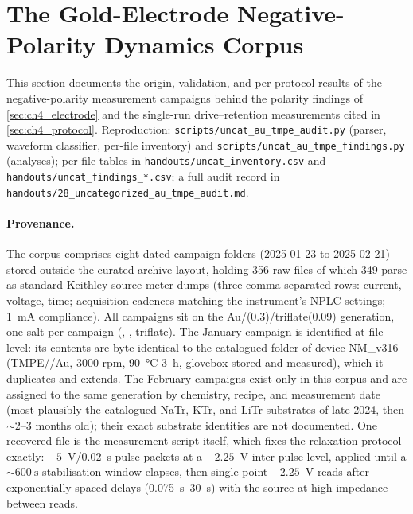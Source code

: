 \section{The Gold-Electrode Negative-Polarity Dynamics Corpus}\label{app:ch4_gold_dynamics}

This section documents the origin, validation, and per-protocol results of the
negative-polarity measurement campaigns behind the polarity findings of
\cref{sec:ch4_electrode} and the single-run drive--retention measurements cited in
\cref{sec:ch4_protocol}. Reproduction: \texttt{scripts/uncat\_au\_tmpe\_audit.py}
(parser, waveform classifier, per-file inventory) and
\texttt{scripts/uncat\_au\_tmpe\_findings.py} (analyses); per-file tables in
\texttt{handouts/uncat\_inventory.csv} and \texttt{handouts/uncat\_findings\_*.csv};
a full audit record in \texttt{handouts/28\_uncategorized\_au\_tmpe\_audit.md}.

\paragraph{Provenance.} The corpus comprises eight dated campaign folders
(2025-01-23 to 2025-02-21) stored outside the curated archive layout, holding
\num{356} raw files of which \num{349} parse as standard Keithley source-meter
dumps (three comma-separated rows: current, voltage, time; acquisition cadences
matching the instrument's NPLC settings; \SI{1}{\milli\ampere} compliance). All
campaigns sit on the Au/\TMPE{}(\num{0.3})/triflate(\num{0.09}) generation, one
salt per campaign (, ,  triflate). The January campaign is
identified at file level: its contents are byte-identical to the catalogued
folder of device NM\_v316 (TMPE/\LiTf{}/Au, \num{3000} rpm, \SI{90}{\celsius}
\SI{3}{\hour}, glovebox-stored and measured), which it duplicates and extends.
The February campaigns exist only in this corpus and are assigned to the same
generation by chemistry, recipe, and measurement date (most plausibly the
catalogued NaTr, KTr, and LiTr substrates of late 2024, then \(\sim\!2\)--\(3\)
months old); their exact substrate identities are not documented. One recovered
file is the measurement script itself, which fixes the relaxation protocol
exactly: \(-5\)~\si{\volt}/\SI{0.02}{\second} pulse packets at a
\(-2.25\)~\si{\volt} inter-pulse level, applied until a \(\sim\!\SI{600}{\second}\)
stabilisation window elapses, then single-point \(-2.25\)~\si{\volt} reads after
exponentially spaced delays (\SIrange{0.075}{30}{\second}) with the source at
high impedance between reads.

